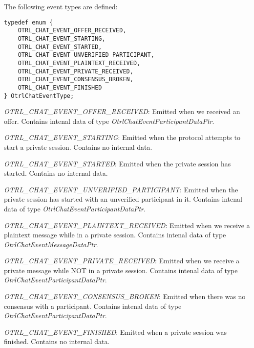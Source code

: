 The following event types are defined:
\begin{lstlisting}[caption={OtrlChatEventType definition}]
typedef enum {
	OTRL_CHAT_EVENT_OFFER_RECEIVED,
	OTRL_CHAT_EVENT_STARTING,
	OTRL_CHAT_EVENT_STARTED,
	OTRL_CHAT_EVENT_UNVERIFIED_PARTICIPANT,
	OTRL_CHAT_EVENT_PLAINTEXT_RECEIVED,
	OTRL_CHAT_EVENT_PRIVATE_RECEIVED,
	OTRL_CHAT_EVENT_CONSENSUS_BROKEN,
	OTRL_CHAT_EVENT_FINISHED	
} OtrlChatEventType;
\end{lstlisting}
\begin{description}
  \item \emph{OTRL\_CHAT\_EVENT\_OFFER\_RECEIVED}: Emitted when we received an offer. Contains intenal data of type \emph{OtrlChatEventParticipantDataPtr}.
  
  \item \emph{OTRL\_CHAT\_EVENT\_STARTING}: Emitted when the protocol attempts to start a private session. Contains no internal data.
  
  \item \emph{OTRL\_CHAT\_EVENT\_STARTED}: Emitted when the private session has started. Contains no internal data.
  
  \item \emph{OTRL\_CHAT\_EVENT\_UNVERIFIED\_PARTICIPANT}: Emitted when the private session has started with an unverified participant in it. Contains intenal data of type \emph{OtrlChatEventParticipantDataPtr}.
  
  \item \emph{OTRL\_CHAT\_EVENT\_PLAINTEXT\_RECEIVED}: Emitted when we receive a plaintext message while in a private session. Contains intenal data of type \emph{OtrlChatEventMessageDataPtr}.
  
  \item \emph{OTRL\_CHAT\_EVENT\_PRIVATE\_RECEIVED}: Emitted when we receive a private message while NOT in a private session. Contains intenal data of type \emph{OtrlChatEventParticipantDataPtr}.
  
  \item \emph{OTRL\_CHAT\_EVENT\_CONSENSUS\_BROKEN}: Emitted when there was no consensus with a participant. Contains intenal data of type \emph{OtrlChatEventParticipantDataPtr}.
  
  \item \emph{OTRL\_CHAT\_EVENT\_FINISHED}: Emitted when a private session was finished. Contains no internal data.

\end{description}


